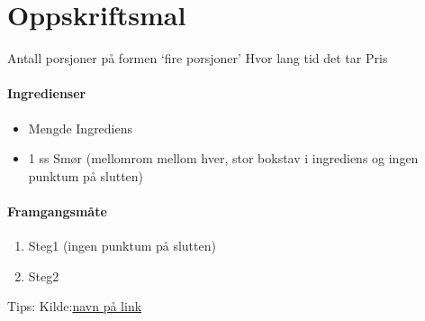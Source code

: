 \section{﻿Oppskriftsmal}
\label{oppskrifsmal}

Antall porsjoner på formen `fire porsjoner'
Hvor lang tid det tar
Pris 

\paragraph{Ingredienser}
\begin{itemize}[noitemsep]
	\item Mengde Ingrediens
	\item 1 ss Smør (mellomrom mellom hver, stor bokstav i ingrediens og ingen punktum på slutten)
\end{itemize}

\paragraph{Framgangsmåte}
\begin{enumerate}[noitemsep]
	\item Steg1 (ingen punktum på slutten)
	\item Steg2
\end{enumerate}

Tips:
Kilde:\href{https://link}{navn på link}
